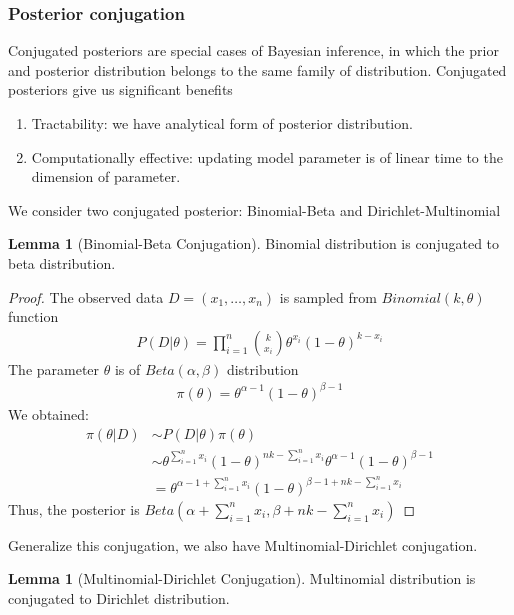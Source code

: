 \documentclass[12pt]{article}
\theoremstyle{definition}
\newtheorem{lemma}[theorem]{Lemma}
\begin{document}
\subsubsection{Posterior conjugation}
Conjugated posteriors are special cases of Bayesian inference, in which the
prior and posterior distribution belongs to the same family of distribution.
Conjugated posteriors give us significant benefits
\begin{enumerate}
\item Tractability: we have analytical form of posterior distribution.
\item Computationally effective: updating model parameter is of linear time to
  the dimension of parameter.
\end{enumerate}
We consider two conjugated posterior: Binomial-Beta and Dirichlet-Multinomial
\begin{lemma}[Binomial-Beta Conjugation]
  Binomial distribution is conjugated to beta distribution.
\end{lemma}
\begin{proof}
  The observed data $D=(x_1,\ldots,x_n)$ is sampled from $Binomial(k, \theta)$ function
  \begin{align*}
    P(D|\theta) = \prod_{i=1}^n{k\choose x_i}\theta^{x_i}(1-\theta)^{k-x_i}
  \end{align*}
  The parameter $\theta$ is of $Beta(\alpha, \beta)$ distribution
  \begin{align*}
    \pi(\theta) = \theta^{\alpha-1}(1-\theta)^{\beta -1}
  \end{align*}
  We obtained:
  \begin{align*}
    \pi(\theta|D) &\sim P(D|\theta)\pi(\theta) \\
                  &\sim \theta^{\sum_{i=1}^n x_i}(1-\theta)^{nk -\sum_{i=1}^n x_i} \theta^{\alpha -1} (1-\theta)^{\beta-1} \\
                  &= \theta^{\alpha - 1 + \sum_{i=1}^n x_i}(1-\theta)^{\beta - 1 + nk -\sum_{i=1}^n x_i}
  \end{align*}
  Thus, the posterior is $Beta(\alpha + \sum_{i=1}^n x_i, \beta + nk -\sum_{i=1}^n x_i)$
\end{proof}
Generalize this conjugation, we also have Multinomial-Dirichlet conjugation.
\begin{lemma}[Multinomial-Dirichlet Conjugation]
  Multinomial distribution is conjugated to Dirichlet distribution.
\end{lemma}
\end{document}
